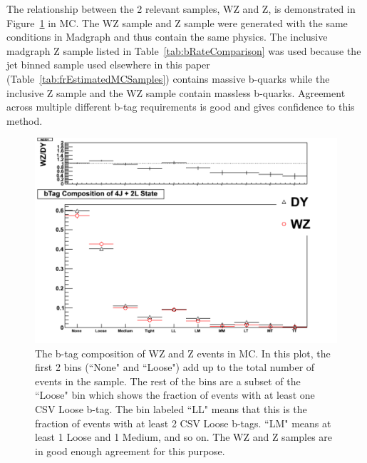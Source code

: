 The relationship between the 2 relevant samples, WZ and Z, is demonstrated in Figure~\ref{fig:wz_v_dy_btags} in MC. The WZ sample and Z sample were generated with the same conditions in Madgraph and thus contain the same physics. The inclusive madgraph Z sample listed in Table~\ref{tab:bRateComparison} was used because the jet binned sample used elsewhere in this paper (Table~\ref{tab:frEstimatedMCSamples}) contains massive b-quarks while the inclusive Z sample and the WZ sample contain massless b-quarks. Agreement across multiple different b-tag requirements is good and gives confidence to this method.\\

\begin{figure}[h]
\begin{center}
\includegraphics[width=0.90\linewidth]{Figs/WZ_Vs_DY_bComposition.pdf}
\caption{\label{fig:wz_v_dy_btags}
The b-tag composition of WZ and Z events in MC. In this plot, the first 2 bins (``None" and ``Loose") add up to the total number of events in the sample. The rest of the bins are a subset of the ``Loose" bin which shows the fraction of events with at least one CSV Loose b-tag. The bin labeled ``LL" means that this is the fraction of events with at least 2 CSV Loose b-tags. ``LM" means at least 1 Loose and 1 Medium, and so on. The WZ and Z samples are in good enough agreement for this purpose.
}
\end{center}
\end{figure}

